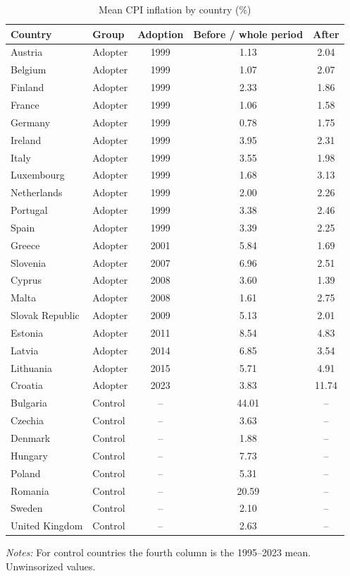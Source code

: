 \begin{table}[htbp]\centering\small
\caption{Mean CPI inflation by country (\%)}\label{tab:countries}
\begin{tabular}{llccc}
\toprule
Country & Group & Adoption & Before / whole period & After \\
\midrule
Austria & Adopter & 1999 & 1.13 & 2.04 \\
Belgium & Adopter & 1999 & 1.07 & 2.07 \\
Finland & Adopter & 1999 & 2.33 & 1.86 \\
France & Adopter & 1999 & 1.06 & 1.58 \\
Germany & Adopter & 1999 & 0.78 & 1.75 \\
Ireland & Adopter & 1999 & 3.95 & 2.31 \\
Italy & Adopter & 1999 & 3.55 & 1.98 \\
Luxembourg & Adopter & 1999 & 1.68 & 3.13 \\
Netherlands & Adopter & 1999 & 2.00 & 2.26 \\
Portugal & Adopter & 1999 & 3.38 & 2.46 \\
Spain & Adopter & 1999 & 3.39 & 2.25 \\
Greece & Adopter & 2001 & 5.84 & 1.69 \\
Slovenia & Adopter & 2007 & 6.96 & 2.51 \\
Cyprus & Adopter & 2008 & 3.60 & 1.39 \\
Malta & Adopter & 2008 & 1.61 & 2.75 \\
Slovak Republic & Adopter & 2009 & 5.13 & 2.01 \\
Estonia & Adopter & 2011 & 8.54 & 4.83 \\
Latvia & Adopter & 2014 & 6.85 & 3.54 \\
Lithuania & Adopter & 2015 & 5.71 & 4.91 \\
Croatia & Adopter & 2023 & 3.83 & 11.74 \\
Bulgaria & Control & -- & 44.01 & -- \\
Czechia & Control & -- & 3.63 & -- \\
Denmark & Control & -- & 1.88 & -- \\
Hungary & Control & -- & 7.73 & -- \\
Poland & Control & -- & 5.31 & -- \\
Romania & Control & -- & 20.59 & -- \\
Sweden & Control & -- & 2.10 & -- \\
United Kingdom & Control & -- & 2.63 & -- \\
\bottomrule
\end{tabular}
\begin{minipage}{0.85\linewidth}\vspace{4pt}\footnotesize\textit{Notes:} For control countries the fourth column is the 1995--2023 mean. Unwinsorized values.\end{minipage}
\end{table}